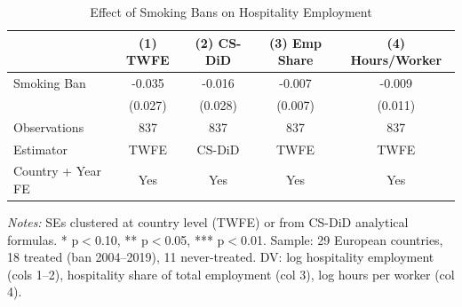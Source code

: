 \begin{table}[H]
\centering
\caption{Effect of Smoking Bans on Hospitality Employment}
\label{tab:main}
\small
\begin{threeparttable}
\begin{tabular}{lcccc}
\toprule
& (1) TWFE & (2) CS-DiD & (3) Emp Share & (4) Hours/Worker \\
\midrule
Smoking Ban & -0.035 & -0.016 & -0.007 & -0.009 \\
& (0.027) & (0.028) & (0.007) & (0.011) \\
\midrule
Observations & 837 & 837 & 837 & 837 \\
Estimator & TWFE & CS-DiD & TWFE & TWFE \\
Country + Year FE & Yes & Yes & Yes & Yes \\
\bottomrule
\end{tabular}
\begin{tablenotes}[flushleft]
\footnotesize
\item \textit{Notes:} SEs clustered at country level (TWFE) or from CS-DiD analytical formulas. * p$<$0.10, ** p$<$0.05, *** p$<$0.01. Sample: 29 European countries, 18 treated (ban 2004--2019), 11 never-treated. DV: log hospitality employment (cols 1--2), hospitality share of total employment (col 3), log hours per worker (col 4).
\end{tablenotes}
\end{threeparttable}
\end{table}
